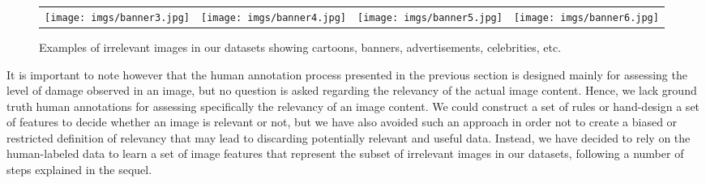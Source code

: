 \documentclass{iscram}
\begin{document}
\begin{figure*}[ht!]
\centering
\begin{tabular}{c c c c }
\texttt{[image: imgs/banner3.jpg]} 
&\texttt{[image: imgs/banner4.jpg]}
&\texttt{[image: imgs/banner5.jpg]}
&\texttt{[image: imgs/banner6.jpg]}\\
\end{tabular}
\caption{Examples of irrelevant images in our datasets showing cartoons, banners, advertisements, celebrities, etc.}
\label{fig:sample_irrelevant}
\end{figure*}

It is important to note however that the human annotation process presented in the previous section is designed mainly for assessing the level of damage observed in an image, but no question is asked regarding the relevancy of the actual image content. Hence, we lack ground truth human annotations for assessing specifically the relevancy of an image content. We could construct a set of rules or hand-design a set of features to decide whether an image is relevant or not, but we have also avoided such an approach in order not to create a biased or restricted definition of relevancy that may lead to discarding potentially relevant and useful data.
Instead, we have decided to rely on the human-labeled data to learn a set of image features that represent the subset of irrelevant images in our datasets, following a number of steps explained in the sequel.
\end{document}
